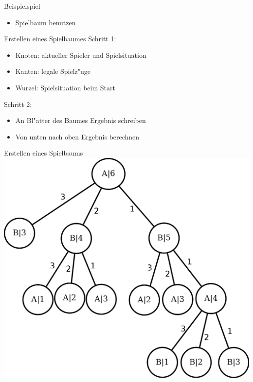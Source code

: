 \documentclass[18pt]{beamer}
\begin{document}
\begin{frame}{Beispielspiel}
\begin{itemize}
\begin{block}{simples Beispielspiel}
Alice und Bob haben sechs M"unzen in der Mitte liegen und nehmen abwechselnd je eine bis drei davon. Wer die letzte M"unze nimmt, gewinnt.
\end{block}
\item Spielbaum benutzen
\end{itemize}
\end{frame}

\begin{frame}{Erstellen eines Spielbaumes}
Schritt 1:
\begin{itemize}
\item Knoten: aktueller Spieler und Spielsituation
\item Kanten: legale Spielz"uge
\item Wurzel: Spielsituation beim Start
\end{itemize}
\pause
Schritt 2:
\begin{itemize}
\item An Bl"atter des Baumes Ergebnis schreiben
\item Von unten nach oben Ergebnis berechnen
\end{itemize}
\end{frame}

\begin{frame}{Erstellen eines Spielbaums}
\includegraphics[scale=0.4]{baum0.png}
\end{frame}
\end{document}
